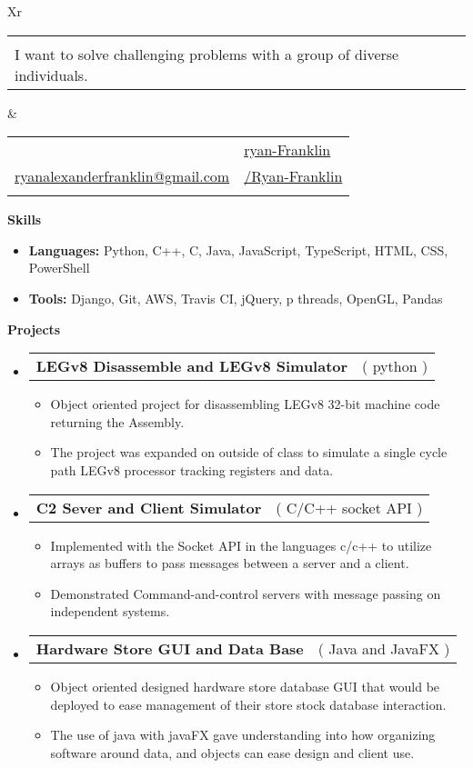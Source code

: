 \documentclass[letterpaper,12pt]{article}[leftmargin=*]
\makeatletter
\def \fullname {Ryan Franklin}
\def \subtitle {}
\def \linkedinicon {\faLinkedin}
\def \linkedinlink {https://www.linkedin.com/in/ryan-franklin-715949211/}
\def \linkedintext {ryan-Franklin}
\def \phoneicon {\faPhone}
\def \phonetext {+1 (512) 354-5907}
\def \emailicon {\faEnvelope}
\def \emaillink {mailto:ryanalexanderfranklin@gmail.com}
\def \emailtext {ryanalexanderfranklin@gmail.com}
\def \githubicon {\faGithub}
\def \githublink {https://github.com/ryan-franklin}
\def \githubtext {/Ryan-Franklin}
\def \headertype {\doublecol} %
\def \entryspacing {-0pt}
\def \linkedin {\linkedinicon \hspace{3pt}\href{\linkedinlink}{\linkedintext}}
\def \phone {\phoneicon \hspace{3pt}{ \phonetext}}
\def \email {\emailicon \hspace{3pt}\href{\emaillink}{\emailtext}}
\def \github {\githubicon \hspace{3pt}\href{\githublink}{\githubtext}}
\def \website {\websiteicon \hspace{3pt}\href{\websitelink}{\websitetext}}
\renewcommand{\section}[2]{\vspace{5pt}
  \colorbox{secondary}{\color{white}\raggedbottom\normalsize\textbf{{#1}{\hspace{7pt}#2}}}
}
\newcommand{\resumeEntryStart}{\begin{itemize}[leftmargin=2.5mm]}
\newcommand{\resumeEntryEnd}{\end{itemize}\vspace{\entryspacing}}
\newcommand{\resumeItemListStart}{\begin{itemize}[leftmargin=4.5mm]}
\newcommand{\resumeItemListEnd}{\end{itemize}}
\newcommand{\resumeItem}[1]{
  \item\small{
    {#1 \vspace{-2pt}}
  }
}
\newcommand{\resumeEntryTD}[2]{
  \vspace{-1pt}\item[]
    \begin{tabularx}{0.97\textwidth}{X@{\hspace{60pt}}r}
      \textbf{\color{primary}#1} & {\firabook\color{accent}\small#2} \\
    \end{tabularx}\vspace{-6pt}
}
\newcommand{\resumeEntryS}[2]{
  \item[]\small{
    \textbf{\color{primary}#1 }{ #2 \vspace{-6pt}}
  }
}
\newcommand{\doublecol}[6]{
  \begin{tabularx}{\textwidth}{Xr}
    {
      \begin{tabular}[c]{l}
        \fontsize{35}{45}\selectfont{\color{primary}{{\textbf{\fullname}}}} \\
        {\textit{\subtitle\vspace{4pt}}I want to solve challenging problems with a group of diverse individuals.} %
      \end{tabular}
    } & {
      \begin{tabular}[c]{l@{\hspace{1.5em}}l}
        {\small#4} & {\small#1} \\
        {\small#5} & {\small#2} \\
        {\small#6} & {\small#3}
      \end{tabular}
    }
  \end{tabularx}
}
\newcommand{\singlecol}[6]{
  \begin{tabularx}{\textwidth}{Xr}
    {
      \begin{tabular}[b]{l}
        \fontsize{35}{45}\selectfont{\color{primary}{{\textbf{\fullname}}}} \\
        {\textit{\subtitle}} %
      \end{tabular}
    } & {
      \begin{tabular}[c]{l}
        {\small#1} \\
        {\small#2} \\
        {\small#3} \\
        {\small#4} \\
        {\small#5} \\
        {\small#6}
      \end{tabular}
    }
  \end{tabularx}
}
\makeatother
\begin{document}


\headertype{\linkedin}{\github}{\website}{\phone}{\email}{} %
\vspace{-10pt} %

\section{\faGears}{Skills }
 \resumeEntryStart
  \resumeEntryS{Languages:} {Python, C++, C, Java, JavaScript, TypeScript, HTML, CSS, PowerShell}
  \resumeEntryS{Tools:} {Django, Git, AWS, Travis CI, jQuery, p threads, OpenGL, Pandas}
 \resumeEntryEnd
 
\section{\faCode}{Projects }

  \resumeEntryStart
    \resumeEntryTD
      {LEGv8 Disassemble and LEGv8 Simulator}{( python )}
    \resumeItemListStart
      \resumeItem {Object oriented project for disassembling LEGv8 32-bit machine code returning the Assembly.}
      \resumeItem { The project was expanded on outside of class to simulate a single cycle path LEGv8 processor tracking registers and data.}
    \resumeItemListEnd
  \resumeEntryEnd

  \resumeEntryStart
    \resumeEntryTD
      {C2 Sever and Client Simulator}{( C/C++ socket API )}
    \resumeItemListStart
      \resumeItem {Implemented with the Socket API in the languages c/c++ to utilize arrays as buffers to pass messages between a server and a client.}
      \resumeItem {Demonstrated Command-and-control servers with message passing on independent systems.}
    \resumeItemListEnd
  \resumeEntryEnd
  
  \resumeEntryStart
    \resumeEntryTD
      {Hardware Store GUI and Data Base }{( Java and JavaFX )}
    \resumeItemListStart
      \resumeItem { Object oriented designed hardware store database GUI that would be deployed to ease management of their store stock database interaction.}
      \resumeItem { The use of java with javaFX gave understanding into how organizing software around data, and objects can ease design and client use. }
    \resumeItemListEnd
  \resumeEntryEnd
  
\end{document}
